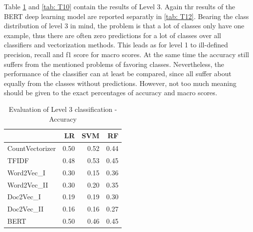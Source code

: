 \documentclass[12pt, a4paper, titlepage]{article}
\begin{document}
Table \ref{tab: T8} and \ref{tab: T10} contain the results of Level 3. Again thr results of the \ac{BERT} deep learning model are reported separatly in \ref{tab: T12}. Bearing the class distribution of level 3 in mind, the problem is that a lot of classes only have one example, thus there are often zero predictions for a lot of classes over all classifiers and vectorization methods. This leads as for level 1 to ill-defined precision, recall and f1 score for macro scores. At the same time the accuracy still suffers from the mentioned problems of favoring classes. Nevertheless, the performance of the classifier can at least be compared, since all suffer about equally from the classes without predictions. However, not too much meaning should be given to the exact percentages of accuracy and macro scores. 

\begin{table}[hb!]
  \center
\begin{tabular}{lrrr}
\hline
{} &   \textbf{LR} &   \textbf{SVM} &    \textbf{RF} \\
\hline
CountVectorizer &  0.50 &  0.52 &  0.44 \\
TFIDF           &  0.48 &  0.53 &  0.45 \\
Word2Vec\_I      &  0.30 &  0.15 &  0.36 \\
Word2Vec\_II     &  0.30 &  0.20 &  0.35 \\
Doc2Vec\_I       &  0.19 &  0.19 &  0.30 \\
Doc2Vec\_II      &  0.16 &  0.16 &  0.27 \\
BERT            &  0.50 &  0.46 &  0.45 \\
\hline
\end{tabular}
\caption{\label{tab: T8} Evaluation of Level 3 classification - Accuracy}
\end{table}
\end{document}
